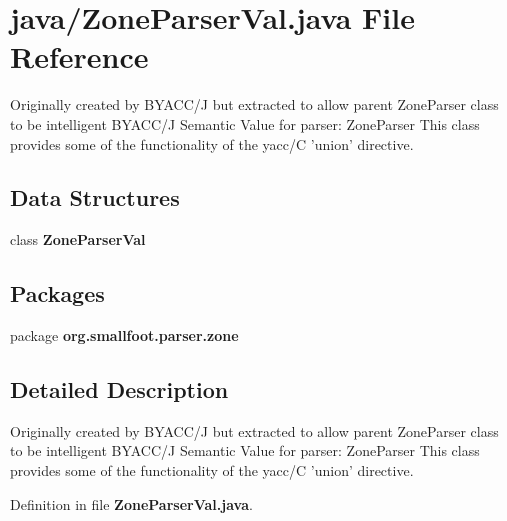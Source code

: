 \section{java/\-Zone\-Parser\-Val.java File Reference}
\label{ZoneParserVal_8java}


Originally created by B\-Y\-A\-C\-C/\-J but extracted to allow parent Zone\-Parser class to be intelligent B\-Y\-A\-C\-C/\-J Semantic Value for parser\-: Zone\-Parser This class provides some of the functionality of the yacc/\-C 'union' directive.  


\subsection*{Data Structures}
\begin{DoxyCompactItemize}
\item 
class {\bf Zone\-Parser\-Val}
\end{DoxyCompactItemize}
\subsection*{Packages}
\begin{DoxyCompactItemize}
\item 
package {\bf org.\-smallfoot.\-parser.\-zone}
\end{DoxyCompactItemize}


\subsection{Detailed Description}
Originally created by B\-Y\-A\-C\-C/\-J but extracted to allow parent Zone\-Parser class to be intelligent B\-Y\-A\-C\-C/\-J Semantic Value for parser\-: Zone\-Parser This class provides some of the functionality of the yacc/\-C 'union' directive. 

Definition in file {\bf Zone\-Parser\-Val.\-java}.

